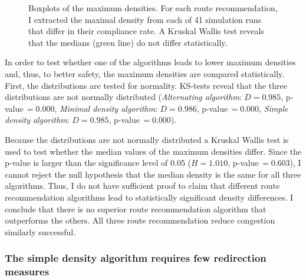 \begin{figure}[hbt!]
\centering
{}
\caption[Boxplots of the maximal densities]{Boxplots of the maximum densities. For each route recommendation, I extracted the maximal density from each of 41 simulation runs that differ in their compliance rate. A Kruskal Wallis test reveals that the medians (green line) do not differ statistically.}
\label{fig:maxdensitiesroutere}
\end{figure}


In order to test whether one of the algorithms leads to lower maximum densities and, thus, to better safety, the maximum densities are compared statistically. First, the distributions are tested for normality. KS-tests reveal that the three distributions are not normally distributed (\textit{Alternating algorithm}: $D=0.985$, p-value\,$=0.000$, \textit{Minimal density algorithm}: $D=0.986$, p-value\,$=0.000$, \textit{Simple density algorithm}: $D=0.985$, p-value\,$=0.000$). 

Because the distributions are not normally distributed a Kruskal Wallis test is used to test whether the median values of the maximum densities differ. Since the p-value is larger than the significance level of 0.05 ($H=1.010$, p-value\,$=0.603$), I cannot reject the null hypothesis that the median density is the same for all three algorithms. Thus, I do not have sufficient proof to claim that different route recommendation algorithms lead to statistically significant density differences. I conclude that there is no superior route recommendation algorithm that outperforms the others. All three route recommendation reduce congestion similarly successful.



\subsubsection{The simple density algorithm requires few redirection measures}

